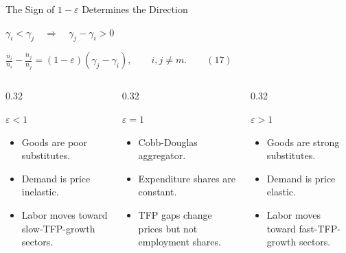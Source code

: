 \begin{frame}{The Sign of $1-\varepsilon$ Determines the Direction}
  \footnotesize
  \begin{center}
    {\color{black}
    \(\displaystyle
      \gamma_i<\gamma_j
      \quad\Longrightarrow\quad
      \gamma_j-\gamma_i>0
    \)}

    \vspace{0.06cm}
    {\color{black}%
    \(\displaystyle
      \frac{\dot n_i}{n_i}
      -
      \frac{\dot n_j}{n_j}
      =
      (1-\varepsilon)(\gamma_j-\gamma_i),
      \qquad i,j\neq m .
      \qquad (17)
    \)}
  \end{center}

  \vspace{0.05cm}
  \begin{columns}[T,onlytextwidth]
    \begin{column}{0.32\textwidth}
      \begin{alertblock}{$\varepsilon<1$}
        \begin{itemize}
          \item Goods are poor substitutes.
          \item Demand is price inelastic.
          \item Labor moves toward slow-TFP-growth sectors.
        \end{itemize}
      \end{alertblock}
    \end{column}
    \begin{column}{0.32\textwidth}
      \begin{block}{$\varepsilon=1$}
        \begin{itemize}
          \item Cobb-Douglas aggregator.
          \item Expenditure shares are constant.
          \item TFP gaps change prices but not employment shares.
        \end{itemize}
      \end{block}
    \end{column}
    \begin{column}{0.32\textwidth}
      \begin{block}{$\varepsilon>1$}
        \begin{itemize}
          \item Goods are strong substitutes.
          \item Demand is price elastic.
          \item Labor moves toward fast-TFP-growth sectors.
        \end{itemize}
      \end{block}
    \end{column}
  \end{columns}


\end{frame}

